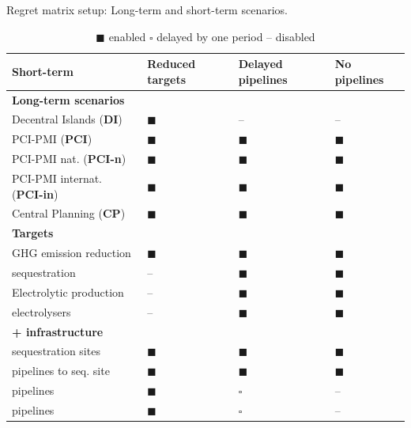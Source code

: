 \documentclass[preprint,12pt,sort&compress]{elsarticle}
\begin{document}
\begin{table}[t]
  \centering
  \caption{Regret matrix setup: Long-term and short-term scenarios.}
  \label{tab:regret_matrix_setup}
  \scriptsize
  \begin{tabularx}{\linewidth}{R{2.8cm}>{\centering\arraybackslash}X>{\centering\arraybackslash}X>{\centering\arraybackslash}X}
    \toprule
    \textbf{Short-term} & \textbf{Reduced targets} & \textbf{Delayed pipelines} & \textbf{No pipelines} \\
    \midrule
    \textbf{Long-term scenarios} & & & \\
    Decentral Islands (\textbf{DI}) & $\blacksquare$ & -- & -- \\
    PCI-PMI (\textbf{PCI}) & $\blacksquare$ & $\blacksquare$ & $\blacksquare$ \\
    PCI-PMI nat. (\textbf{PCI-n}) & $\blacksquare$ & $\blacksquare$ & $\blacksquare$\\
    PCI-PMI internat. (\textbf{PCI-in}) & $\blacksquare$ & $\blacksquare$ & $\blacksquare$ \\
    Central Planning (\textbf{CP}) & $\blacksquare$ & $\blacksquare$ & $\blacksquare$ \\
    \midrule
    \textbf{Targets} & & & \\
    GHG emission reduction &  $\blacksquare$ &  $\blacksquare$ &  $\blacksquare$ \\
     sequestration &  -- &  $\blacksquare$ &  $\blacksquare$ \\
    Electrolytic  production &  -- &  $\blacksquare$ &  $\blacksquare$ \\
     electrolysers &  -- &  $\blacksquare$ &  $\blacksquare$ \\
    \midrule
    \textbf{ +  infrastructure} & & & \\
     sequestration sites & $\blacksquare$ &  $\blacksquare$ &  $\blacksquare$ \\
     pipelines to seq. site & $\blacksquare$ &  $\blacksquare$ &  $\blacksquare$ \\
     pipelines & $\blacksquare$ &  $\square$ &  -- \\
     pipelines & $\blacksquare$ &  $\square$ &  -- \\
    \bottomrule
  \end{tabularx}
  \caption*{\scriptsize $\blacksquare$ enabled \quad $\square$ delayed by one period \quad -- disabled}
\end{table}
\end{document}
